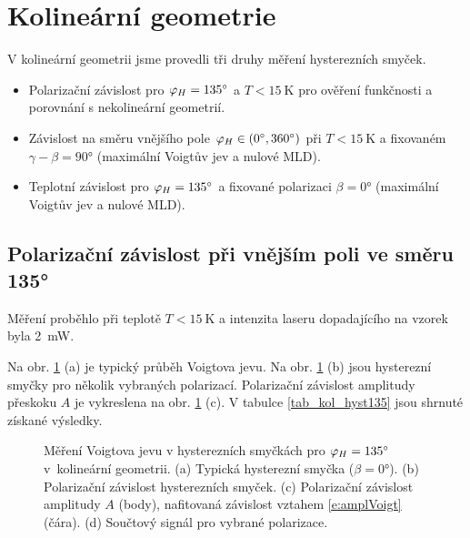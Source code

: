\section{Kolineární geometrie} \label{kap_kolinearni}
V kolineární geometrii jsme provedli tři druhy měření hysterezních smyček. 
\begin{itemize}
\item Polarizační závislost pro $\varphi_H=\ang{135}$ a $T<\SI{15}{\kelvin}$ pro ověření funkčnosti a porovnání s nekolineární geometrií.
\item Závislost na směru vnějšího pole $\varphi_H \in (\ang{0},\ang{360})$ při $T<\SI{15}{\kelvin}$ a fixovaném $\gamma-\beta=\ang{90}$ (maximální Voigtův jev a nulové MLD).
\item Teplotní závislost pro $\varphi_H=\ang{135}$ a fixované polarizaci $\beta=\ang{0}$ (maximální Voigtův jev a nulové MLD).
\end{itemize}


\subsection{Polarizační závislost při vnějším poli ve směru \ang{135}}
Měření proběhlo při teplotě $T<\SI{15}{\kelvin}$ a intenzita laseru dopadajícího na vzorek byla \SI{2}{\milli\watt}.

Na obr. \ref{kol_vysledky_voigt} (a) je typický průběh Voigtova jevu. Na obr. \ref{kol_vysledky_voigt} (b) jsou hysterezní smyčky pro několik vybraných polarizací. Polarizační závislost amplitudy přeskoku $A$ je vykreslena na obr. \ref{kol_vysledky_voigt} (c). V tabulce \ref{tab_kol_hyst135} jsou shrnuté získané výsledky.

\begin{figure}[htbp]\centering
{}
	\caption{Měření Voigtova jevu v hysterezních smyčkách pro $\varphi_H=\ang{135}$ v~kolineární geometrii. (a) Typická hysterezní smyčka ($\beta=\ang{0}$). (b) Polarizační závislost hysterezních smyček. (c) Polarizační závislost amplitudy $A$ (body), nafitovaná závislost vztahem \eqref{e:amplVoigt} (čára). (d) Součtový signál pro vybrané polarizace.}\label{kol_vysledky_voigt}
\end{figure}

